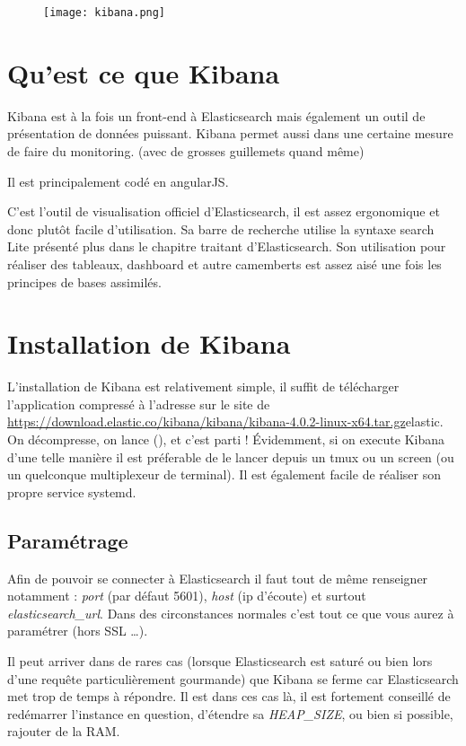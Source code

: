\begin{figure}[H]
\center
\texttt{[image: kibana.png]}
\label{fig:kibana.png}
\end{figure}
\section{Qu'est ce que Kibana}
Kibana est à la fois un front-end à Elasticsearch mais également un outil de présentation
de données puissant. Kibana permet aussi dans une certaine mesure de faire du monitoring.
(avec de grosses guillemets quand même)

Il est principalement codé en angularJS.

C'est l'outil de visualisation officiel d'Elasticsearch, il est assez ergonomique 
et donc plutôt facile d'utilisation. Sa barre de recherche utilise la syntaxe 
search Lite présenté plus dans le chapitre traitant d'Elasticsearch.
Son utilisation pour réaliser des tableaux, dashboard et autre camemberts est assez
aisé une fois les principes de bases assimilés.

\section{Installation de Kibana}
L'installation de Kibana est relativement simple, il suffit de télécharger l'application
compressé à l'adresse sur le site de \url{https://download.elastic.co/kibana/kibana/kibana-4.0.2-linux-x64.tar.gz}{elastic}.
On décompresse, on lance (), et c'est parti !
Évidemment, si on execute Kibana d'une telle manière il est préferable de le lancer
depuis un tmux ou un screen (ou un quelconque multiplexeur de terminal). Il est 
également facile de réaliser son propre service systemd.

\subsection{Paramétrage}
Afin de pouvoir se connecter à Elasticsearch il faut tout de même renseigner 
 notamment : \emph{port} (par défaut 5601), \emph{host} (ip d'écoute)
et surtout \emph{elasticsearch\_url}.
Dans des circonstances normales c'est tout ce que vous aurez à paramétrer (hors 
SSL \ldots{}).

Il peut arriver dans de rares cas (lorsque Elasticsearch est saturé ou bien lors 
d'une requête particulièrement gourmande) que Kibana se ferme car Elasticsearch met
trop de temps à répondre. Il est dans ces cas là, il est fortement conseillé de 
redémarrer l'instance en question, d'étendre sa \emph{HEAP\_SIZE}, ou bien si possible, 
rajouter de la RAM.

